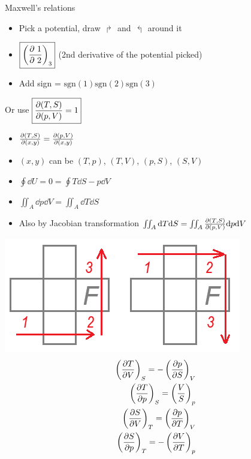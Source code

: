 \documentclass{article}
\theoremstyle{remark}
\begin{document}
\begin{enumerate}
        Maxwell's relations\newline
        \begin{minipage}{0.5\linewidth}
            \begin{itemize}
                \item Pick a potential, draw $\Rsh$ and $\Lsh$ around it
                \item $\boxed{\left(\pdv{\ 1}{\ 2}\right)_3}$ \newline
                    (2nd derivative of the potential picked)
                \item Add sign = $\text{sgn}(1)\text{sgn}(2)\text{sgn}(3)$
            \end{itemize}
            Or use $\boxed{\pdv{(T,S)}{(p,V)}=1}$ \begin{itemize}
                \item $\pdv{(T,S)}{(x,y)}=\pdv{(p,V)}{(x,y)}$
                \item $(x,y)$ can be $(T,p)$, $(T,V)$, $(p,S)$, $(S,V)$
                \item $\oint\dd U=0 =\oint T\dd S-p\dd V$
                \item $\iint_A\dd p\dd V=\iint_A\dd T\dd S$
                \item Also by Jacobian transformation $\iint_A\dd T\dd S=\iint_A\pdv{(T,S)}{(p,V)}\dd p\dd V$
            \end{itemize}
        \end{minipage}
        \begin{minipage}{0.5\linewidth}
            \includegraphics*[width=\linewidth]{maxwell_relation_mnemonic.png}\newline
            \begin{align*}
                \left(\pdv{T}{V}\right)_S=-\left(\pdv{p}{S}\right)_V\\
                \left(\pdv{T}{p}\right)_S=\left(\frac{V}{S}\right)_p\\
                \left(\pdv{S}{V}\right)_T=\left(\pdv{p}{T}\right)_V\\
                \left(\pdv{S}{p}\right)_T=-\left(\pdv{V}{T}\right)_p
            \end{align*}
        \end{minipage}


\end{enumerate}
\end{document}
